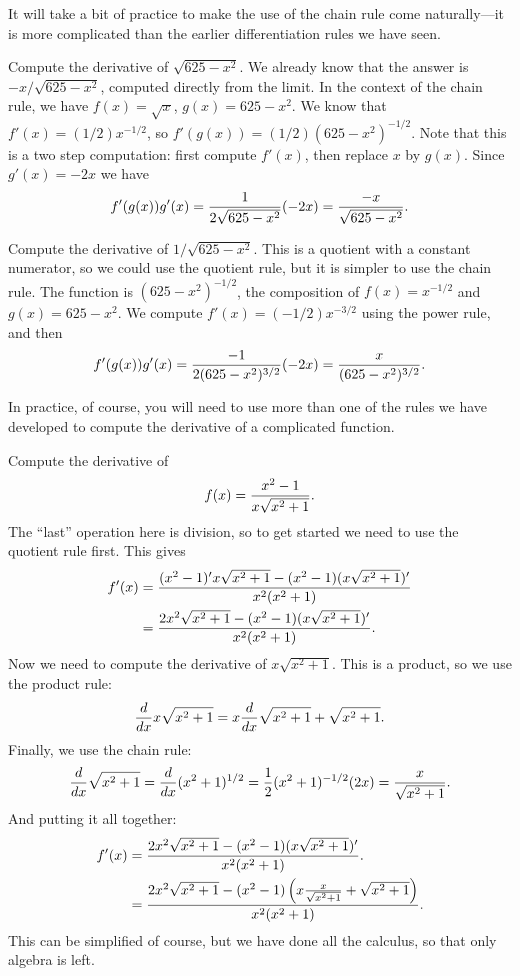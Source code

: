 It will take a bit of practice to make the use of the chain rule come
naturally---it is more complicated than the earlier differentiation
rules we have seen.

\begin{example}
Compute the derivative of $\sqrt{625-x^2}$. We already know that the
answer is $-x/\sqrt{625-x^2}$, computed directly from the limit. In
the context of the chain rule, we have $f(x)=\sqrt{x}$,
$g(x)=625-x^2$. We know that $f'(x)=(1/2)x^{-1/2}$, so $f'(g(x))=
(1/2)(625-x^2)^{-1/2}$. Note that this is a two step computation:
first compute $f'(x)$, then replace $x$ by $g(x)$. Since $g'(x)=-2x$
we have
$$f'(g(x))g'(x)={1\over 2\sqrt{625-x^2}}(-2x)={-x\over
    \sqrt{625-x^2}}.
$$
\vskip-10pt
\end{example}

\begin{example}
Compute the derivative of $1/\sqrt{625-x^2}$. This is a quotient with
a constant numerator, so we could use the quotient rule, but it is
simpler to use the chain rule. The function is $(625-x^2)^{-1/2}$, the
composition of $f(x)=x^{-1/2}$ and $g(x)=625-x^2$. We compute
$f'(x)=(-1/2)x^{-3/2}$ using the power rule, and then
$$f'(g(x))g'(x)={-1\over 2(625-x^2)^{3/2}}(-2x)={x\over (625-x^2)^{3/2}}.
$$
\vskip-10pt
\end{example}

In practice, of course, you will need to use more than one of the
rules we have developed to compute the derivative of a complicated
function.

\begin{example}
Compute the derivative of $$f(x)={x^2-1\over x\sqrt{x^2+1}}.$$
The ``last'' operation here is division, so to get started we need to
use the quotient rule first. This gives
\begin{align*}
f'(x)&={(x^2-1)'x\sqrt{x^2+1}-(x^2-1)(x\sqrt{x^2+1})'\over
x^2(x^2+1)} \\
&={2x^2\sqrt{x^2+1}-(x^2-1)(x\sqrt{x^2+1})'\over
x^2(x^2+1)}. \\
\end{align*}
Now we need to compute the derivative of $x\sqrt{x^2+1}$. This is a
product, so we use the product rule:
$${d\over dx}x\sqrt{x^2+1}=x{d\over dx}\sqrt{x^2+1}+\sqrt{x^2+1}.$$
Finally, we use the chain rule:
$${d\over dx}\sqrt{x^2+1}={d\over dx}(x^2+1)^{1/2}=
{1\over 2}(x^2+1)^{-1/2}(2x)={x\over \sqrt{x^2+1}}.$$
And putting it all together:
\begin{align*}
f'(x)&={2x^2\sqrt{x^2+1}-(x^2-1)(x\sqrt{x^2+1})'\over
x^2(x^2+1)}. \\
&={2x^2\sqrt{x^2+1}-(x^2-1)\left(x{{x\over \sqrt{x^2+1}}}
+\sqrt{x^2+1}\right)\over
x^2(x^2+1)}. \\
\end{align*}
This can be simplified of course, but we have done all the calculus,
so that only algebra is left.
\end{example}

